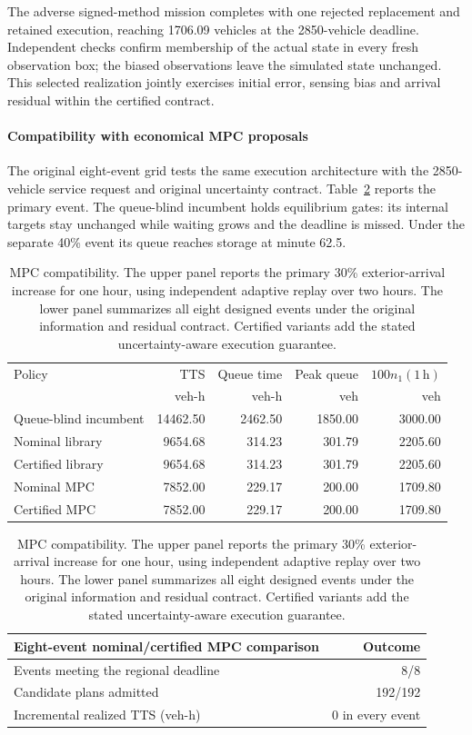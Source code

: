 \documentclass[preprint,12pt]{elsarticle}
\numberwithin{equation}{section}
\begin{document}
The adverse signed-method mission completes with one rejected replacement
and retained execution, reaching 1706.09 vehicles at the 2850-vehicle
deadline. Independent checks confirm membership of the actual state in
every fresh observation box; the biased observations leave the simulated
state unchanged. This selected realization jointly exercises initial error,
sensing bias and arrival residual within the certified contract.

\paragraph{Compatibility with economical MPC proposals}
The original eight-event grid tests the same execution architecture with
the 2850-vehicle service request and original uncertainty contract.
Table~\ref{tab:new-incident-primary} reports the primary event. The
queue-blind incumbent holds equilibrium gates: its internal targets stay
unchanged while waiting grows and the deadline is missed. Under the
separate 40\% event its queue reaches storage at minute 62.5.

\begin{table}[t]
\centering
\caption{MPC compatibility. The upper panel reports the primary 30\%
exterior-arrival increase for one hour, using independent adaptive replay
over two hours. The lower panel summarizes all eight designed events under
the original information and residual contract. Certified variants add the
stated uncertainty-aware execution guarantee.}
\label{tab:new-incident-primary}
\small
\setlength{\tabcolsep}{4pt}
\begin{tabular}{@{}lrrrr@{}}
\toprule
Policy & TTS & Queue time & Peak queue & $100n_1(1\,\mathrm h)$\\
& veh-h & veh-h & veh & veh\\
\midrule
Queue-blind incumbent & 14462.50 & 2462.50 & 1850.00 & 3000.00\\
Nominal library & 9654.68 & 314.23 & 301.79 & 2205.60\\
Certified library & 9654.68 & 314.23 & 301.79 & 2205.60\\
Nominal MPC & 7852.00 & 229.17 & 200.00 & 1709.80\\
Certified MPC & 7852.00 & 229.17 & 200.00 & 1709.80\\
\bottomrule
\end{tabular}
\par\medskip
\begin{tabular}{@{}lr@{}}
\toprule
Eight-event nominal/certified MPC comparison & Outcome\\
\midrule
Events meeting the regional deadline & 8/8\\
Candidate plans admitted & 192/192\\
Incremental realized TTS (veh-h) & 0 in every event\\
\bottomrule
\end{tabular}
\end{table}
\end{document}
